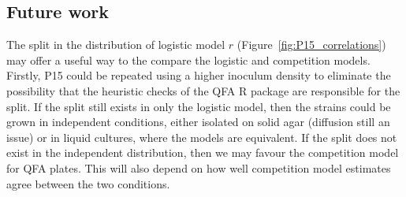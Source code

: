 
\subsection{Future work}

The split in the distribution of logistic model \(r\)
(Figure~\ref{fig:P15_correlations}) may offer a useful way to the
compare the logistic and competition models. Firstly, P15 could be
repeated using a higher inoculum density to eliminate the possibility
that the heuristic checks of the QFA R package are responsible for the
split. If the split still exists in only the logistic model, then the
strains could be grown in independent conditions, either isolated on
solid agar (diffusion still an issue) or in liquid cultures, where the
models are equivalent. If the split does not exist in the independent
distribution, then we may favour the competition model for QFA
plates. This will also depend on how well competition model estimates
agree between the two conditions.


